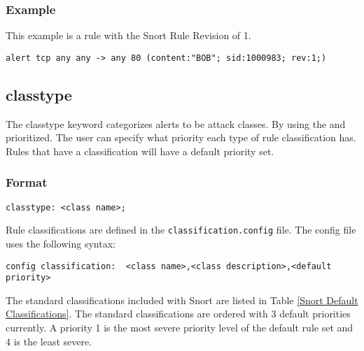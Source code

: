 \documentclass[english]{report}
\begin{document}
\subsubsection{Example}
This example is a rule with the Snort Rule Revision of 1.
\begin{verbatim}
alert tcp any any -> any 80 (content:"BOB"; sid:1000983; rev:1;)
\end{verbatim}

\subsection{classtype}

The classtype keyword categorizes alerts to be attack classes. By
using the and prioritized. The user can specify what priority each
type of rule classification has. Rules that have a classification
will have a default priority set. 

\subsubsection{Format}

\begin{verbatim}
classtype: <class name>;
\end{verbatim}
Rule classifications are defined in the \texttt{classification.config}
file. The config file uses the following syntax:

\begin{verbatim}
config classification:  <class name>,<class description>,<default priority>
\end{verbatim}
The standard classifications included with Snort are listed in Table
\ref{Snort Default Classifications}. The standard classifications
are ordered with 3 default priorities currently. A priority 1 is the
most severe priority level of the default rule set and 4 is the least
severe.
\end{document}
